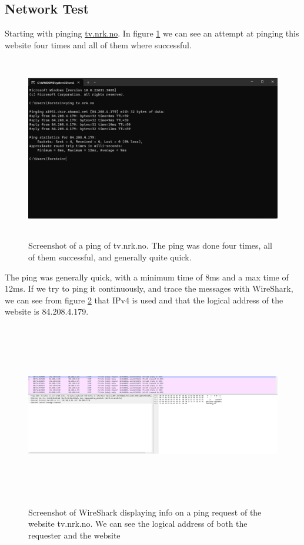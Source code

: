 \documentclass[11pt, A4paper, english]{article}
\begin{document}
			\subsection{Network Test}
Starting with pinging \url{tv.nrk.no}. In figure \ref{im:ping_nrk} we can see an attempt at pinging this website four times and all of them where successful.
				\begin{figure}
\includegraphics[width=12.6cm, height=8cm]{ping_nrk.png}
\caption{Screenshot of a ping of tv.nrk.no. The ping was done four times, all of them successful, and generally quite quick.}
\label{im:ping_nrk}	
				\end{figure}
The ping was generally quick, with a minimum time of 8ms and a max time of 12ms. If we try to ping it continuously, and trace the messages with WireShark, we can see from figure \ref{im:con_ping_nrk} that IPv4 is used and that the logical address of the website is 84.208.4.179.
				\begin{figure}
\includegraphics[width=12.6cm, height=8cm]{continous_ping_nrk.png}
\caption{Screenshot of WireShark displaying info on a ping request of the website tv.nrk.no. We can see the logical address of both the requester and the website}
\label{im:con_ping_nrk}	
				\end{figure}
\end{document}
